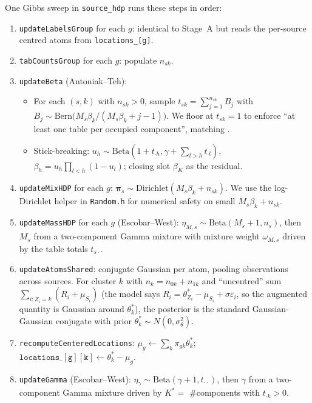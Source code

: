 \documentclass[11pt]{article}
\theoremstyle{plain}
\theoremstyle{definition}
\theoremstyle{remark}
\newcommand{\1}{\mathds{1}}
\begin{document}
One Gibbs sweep in \texttt{source\_hdp} runs these steps in order:
\begin{enumerate}[noitemsep, label=(\arabic*)]
  \item \texttt{updateLabelsGroup} for each $g$: identical to Stage~A but reads the per-source centred atoms from \texttt{locations\_[g]}.
  \item \texttt{tabCountsGroup} for each $g$: populate $n_{sk}$.
  \item \texttt{updateBeta} (Antoniak--Teh):
    \begin{itemize}[noitemsep]
      \item For each $(s, k)$ with $n_{sk} > 0$, sample $t_{sk} = \sum_{j=1}^{n_{sk}} B_{j}$ with $B_j \sim \mathrm{Bern}\big(M_s \beta_k / (M_s \beta_k + j - 1)\big)$. We floor at $t_{sk} = 1$ to enforce ``at least one table per occupied component'', matching \citet{teh2006hierarchical}.
      \item Stick-breaking: $u_h \sim \mathrm{Beta}(1 + t_{\cdot h}, \gamma + \sum_{l > h} t_{\cdot l})$, $\beta_h = u_h \prod_{l < h}(1 - u_l)$; closing slot $\beta_K$ as the residual.
    \end{itemize}
  \item \texttt{updateMixHDP} for each $g$: $\bm{\pi}_s \sim \mathrm{Dirichlet}(M_s \beta_k + n_{sk})$. We use the log-Dirichlet helper in \texttt{Random.h} for numerical safety on small $M_s \beta_k + n_{sk}$.
  \item \texttt{updateMassHDP} for each $g$ (Escobar--West): $\eta_{M,s} \sim \mathrm{Beta}(M_s + 1, n_s)$, then $M_s$ from a two-component Gamma mixture with mixture weight $\omega_{M,s}$ driven by the table totals $t_{s\cdot}$.
  \item \texttt{updateAtomsShared}: conjugate Gaussian per atom, pooling observations across sources. For cluster $k$ with $n_k = n_{0k} + n_{1k}$ and ``uncentred'' sum $\sum_{i: Z_i = k}(R_i + \mu_{S_i})$ (the model says $R_i = \theta^*_{Z_i} - \mu_{S_i} + \sigma\varepsilon_i$, so the augmented quantity is Gaussian around $\theta^*_k$), the posterior is the standard Gaussian-Gaussian conjugate with prior $\theta^*_k \sim N(0, \sigma_\theta^2)$.
  \item \texttt{recomputeCenteredLocations}: $\mu_g \leftarrow \sum_k \pi_{gk}\theta^*_k$; $\mathtt{locations\_[g][k]} \leftarrow \theta^*_k - \mu_g$.
  \item \texttt{updateGamma} (Escobar--West): $\eta_\gamma \sim \mathrm{Beta}(\gamma + 1, t_{\cdot\cdot})$, then $\gamma$ from a two-component Gamma mixture driven by $K^* = $ \#components with $t_{\cdot k} > 0$.
\end{enumerate}
\end{document}
